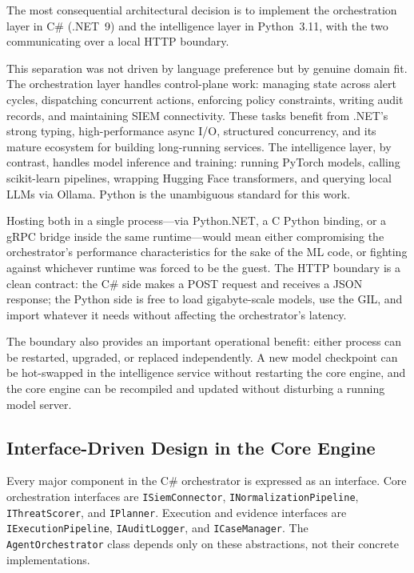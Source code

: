 The most consequential architectural decision is to implement the orchestration layer
in C\# (.NET~9) and the intelligence layer in Python~3.11, with the two communicating
over a local HTTP boundary.

This separation was not driven by language preference but by genuine domain fit.
The orchestration layer handles control-plane work: managing state across
alert cycles, dispatching concurrent actions, enforcing policy constraints, writing
audit records, and maintaining SIEM connectivity. These tasks benefit from .NET's
strong typing, high-performance async I/O, structured concurrency, and its mature
ecosystem for building long-running services. The intelligence layer, by contrast,
handles model inference and training: running PyTorch models, calling
scikit-learn pipelines, wrapping Hugging Face transformers, and querying local LLMs
via Ollama. Python is the unambiguous standard for this work.

Hosting both in a single process---via Python.NET, a C Python binding, or
a gRPC bridge inside the same runtime---would mean either compromising the orchestrator's
performance characteristics for the sake of the ML code, or fighting against whichever
runtime was forced to be the guest. The HTTP boundary is a clean contract: the C\# side
makes a POST request and receives a JSON response; the Python side is free to load
gigabyte-scale models, use the GIL, and import whatever it needs without affecting the
orchestrator's latency.

The boundary also provides an important operational benefit: either process can be
restarted, upgraded, or replaced independently. A new model checkpoint can be hot-swapped
in the intelligence service without restarting the core engine, and the core engine can
be recompiled and updated without disturbing a running model server.

\subsection{Interface-Driven Design in the Core Engine}

Every major component in the C\# orchestrator is expressed as an interface.
Core orchestration interfaces are \texttt{ISiemConnector},
\texttt{INormalizationPipeline}, \texttt{IThreatScorer}, and \texttt{IPlanner}.
Execution and evidence interfaces are \texttt{IExecutionPipeline},
\texttt{IAuditLogger}, and \texttt{ICaseManager}. The \texttt{AgentOrchestrator}
class depends only on these abstractions, not their concrete implementations.

